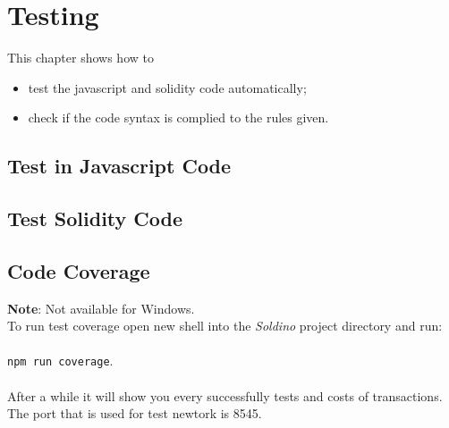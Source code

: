 \section{Testing}
This chapter shows how to
\begin{itemize}
	\item test the javascript and solidity code automatically;
	\item check if the code syntax is complied to the rules given.
\end{itemize}
\subsection{Test in Javascript Code}
\subsection{Test Solidity Code}
\subsection{Code Coverage}
\textbf{Note}: Not available for Windows. \\
To run test coverage open new shell into the \textit{Soldino} project directory and run: \\ \\ \texttt{npm run coverage}. \\ \\ After a while it will show you every successfully tests and costs of transactions. The port that is used for test newtork is 8545.